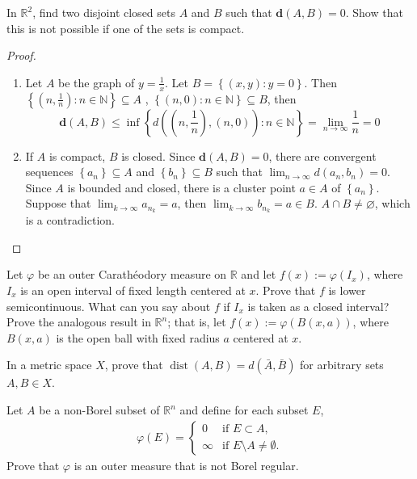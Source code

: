 \documentclass[../main.tex]{subfiles}
\begin{document}
\begin{exercise}{}{}
In $\mathbb{R}^2$, find two disjoint closed sets $A$ and $B$ such that $\mathbf{d}(A, B) = 0$. Show that this is not possible if one of the sets is compact.
\end{exercise}

\begin{proof}
    \begin{enumerate}
        \item Let \(  A  \) be the graph of \(  y= \frac{1 }{x }   \). Let \(  B = \left\{ \left( x,y \right): y= 0  \right\}  \). Then \(  \left\{ \left( n,\frac{1 }{n }  \right): n\in \mathbb{N}   \right\}  \subseteq A\) , \(  \left\{ \left( n,0 \right): n \in \mathbb{N}   \right\}\subseteq B  \), then \[
        \mathbf{d}\left( A,B \right)\le \inf \left\{ d\left( \left( n,\frac{1 }{n }  \right), \left( n,0 \right)   \right)  : n \in \mathbb{N} \right\} = \lim_{n\to \infty}\frac{1 }{n }= 0  
        \]
        \item If \(  A  \) is compact, \(  B  \) is closed. Since \(  \mathbf{d}\left( A,B \right)= 0   \), there are convergent sequences \(  \left\{ a_{n} \right\}\subseteq A  \) and \(  \left\{ b_{n} \right\}\subseteq B  \) such that \(  \lim_{n\to \infty}d\left( a_{n},b_{n} \right)= 0   \).   Since \(  A  \) is bounded and closed, there is a  cluster point \(   a \in A  \) of \(  \left\{ a_{n} \right\}  \). Suppose that \(  \lim_{k\to \infty}a_{n_{k}}= a  \), then \(  \lim_{k\to \infty}b_{n_{k}}= a\in B  \). \(  A\cap B\neq \varnothing  \), which is a contradiction.      
    \end{enumerate}
    
\end{proof}
\begin{exercise}{}{}
Let $\varphi$ be an outer Carathéodory measure on $\mathbb{R}$ and let $f(x) := \varphi(I_x)$, where $I_x$ is an open interval of fixed length centered at $x$. Prove that $f$ is lower semicontinuous. What can you say about $f$ if $I_x$ is taken as a closed interval? Prove the analogous result in $\mathbb{R}^n$; that is, let $f(x) := \varphi(B(x, a))$, where $B(x, a)$ is the open ball with fixed radius $a$ centered at $x$.
\end{exercise}
\begin{exercise}{}{}
In a metric space $X$, prove that $\operatorname{dist}(A, B) = d(\bar{A}, \bar{B})$ for arbitrary sets $A, B \in X$.
\end{exercise}
\begin{exercise}{}{}
Let $A$ be a non-Borel subset of $\mathbb{R}^n$ and define for each subset $E$,
\[\begin{aligned}
\varphi(E) = \begin{cases} 0 & \text{if } E \subset A, \\ \infty & \text{if } E \setminus A \neq \emptyset. \end{cases}
\end{aligned}\]
Prove that $\varphi$ is an outer measure that is not Borel regular.
\end{exercise}
\end{document}
